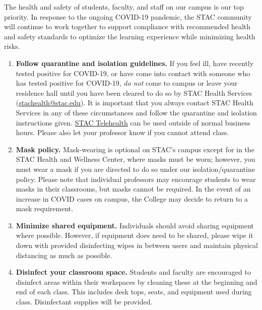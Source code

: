 \documentclass[11pt,letterpaper]{article}
\begin{document}


The health and safety of students, faculty, and staff on our campus is our top priority. In response to the ongoing COVID-19 pandemic, the STAC community will continue to work together to support compliance with recommended health and safety standards to optimize the learning experience while minimizing health risks.  

	\begin{enumerate}[1.]
	\item {\bfseries Follow quarantine and isolation guidelines.} If you feel ill, have recently tested positive for COVID-19, or have come into contact with someone who has tested positive for COVID-19, {\itshape do not} come to campus or leave your residence hall until you have been cleared to do so by STAC Health Services (\href{mailto:stachealth@stac.edu}{stachealth@stac.edu}). It is important that you always contact STAC Health Services in any of these circumstances and follow the quarantine and isolation instructions given. \href{https://timely.md/schools/index.html?school=stac&}{STAC Telehealth} can be used outside of normal business hours. Please also let your professor know if you cannot attend class. 

	\item {\bfseries Mask policy.} Mask-wearing is optional on STAC’s campus except for in the STAC Health and Wellness Center, where masks must be worn; however, you must wear a mask if you are directed to do so under our isolation/quarantine policy. Please note that individual professors may encourage students to wear masks in their classrooms, but masks cannot be required. In the event of an increase in COVID cases on campus, the College may decide to return to a mask requirement. 

	\item {\bfseries Minimize shared equipment.} Individuals should avoid sharing equipment where possible. However, if equipment does need to be shared, please wipe it down with provided disinfecting wipes in between users and maintain physical distancing as much as possible.

	\item {\bfseries Disinfect your classroom space.} Students and faculty are encouraged to disinfect areas within their workspaces by cleaning these at the beginning and end of each class. This includes desk tops, seats, and equipment used during class. Disinfectant supplies will be provided. 


\end{enumerate}
\end{document}
